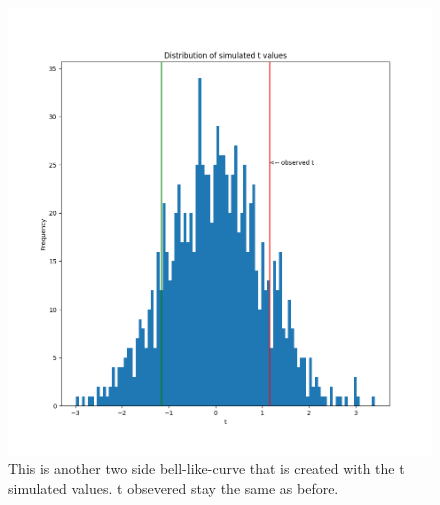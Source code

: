 \documentclass[12pt]{article}
\begin{document}
                 \begin{figure}
                 \includegraphics[width=\linewidth]{./Figure2.png}
                 \caption{This is another two side bell-like-curve that is created with the t simulated values. t obsevered stay the same as before.}
                \label{figure:graph2}
                 \end{figure} 
                
\end{document}
